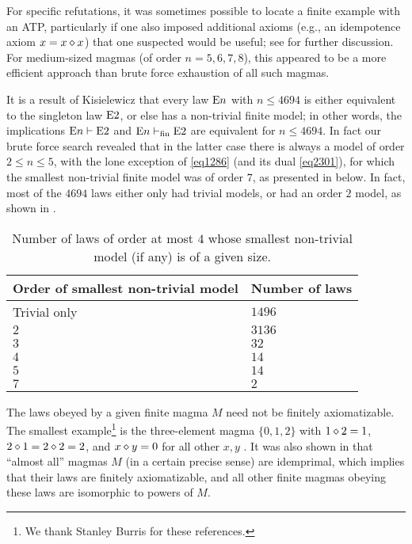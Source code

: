 For specific refutations, it was sometimes possible to locate a finite example with an ATP, particularly if one also imposed additional axioms (e.g., an idempotence axiom $x = x \diamond x$) that one suspected would be useful; see  for further discussion.  For medium-sized magmas (of order $n=5,6,7,8$), this appeared to be a more efficient approach than brute force exhaustion of all such magmas.

It is a result of Kisielewicz \cite{Kisielewicz} that every law $\mathrm{E}n$ with $n \leq 4694$ is either equivalent to the singleton law $\mathrm{E}2$, or else has a non-trivial finite model; in other words, the implications $\mathrm{E}n \vdash \mathrm{E}2$ and $\mathrm{E}n \vdash_{\mathrm{fin}} \mathrm{E}2$ are equivalent for $n \leq 4694$.  In fact our brute force search revealed that in the latter case there is always a model of order $2 \leq n \leq 5$, with the lone exception of \eqref{eq1286} (and its dual \eqref{eq2301}), for which the smallest non-trivial finite model was of order $7$, as presented in  below.  In fact, most of the $\num{4694}$ laws either only had trivial models, or had an order $2$ model, as shown in .
\begin{table}
\centering
\begin{tabular}{ll}
  \hline
Order of smallest non-trivial model & Number of laws \\
\hline
Trivial only & $1496$ \\
$2$ & $3136$ \\
$3$ & $32$ \\
$4$ & $14$ \\
$5$ & $14$ \\
$7$ & $2$\\
\hline
\end{tabular}
\caption{Number of laws of order at most $4$ whose smallest non-trivial model (if any) is of a given size.}\label{size-table}
\end{table}

\begin{remark} The laws obeyed by a given finite magma $M$ need not be finitely axiomatizable.  The smallest example\footnote{We thank Stanley Burris for these references.} is the three-element magma $\{0,1,2\}$ with $1 \diamond 2 = 1$, $2 \diamond 1 = 2 \diamond 2 = 2$, and $x \diamond y = 0$ for all other $x,y$ \cite{murskii-1}.  It was also shown in \cite{murskii-2} that ``almost all'' magmas $M$ (in a certain precise sense) are idemprimal, which implies that their laws are finitely axiomatizable, and all other finite magmas obeying these laws are isomorphic to powers of $M$.
\end{remark}

